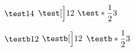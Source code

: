\documentclass[12pt, a4paper]{article}
\begin{document}
$\test14$
$\test[\Big]12$
$\test*{\dfrac12}3$

$\testb12$
$\testb[\Big]12$
$\testb*{\dfrac12}3$
\end{document}
